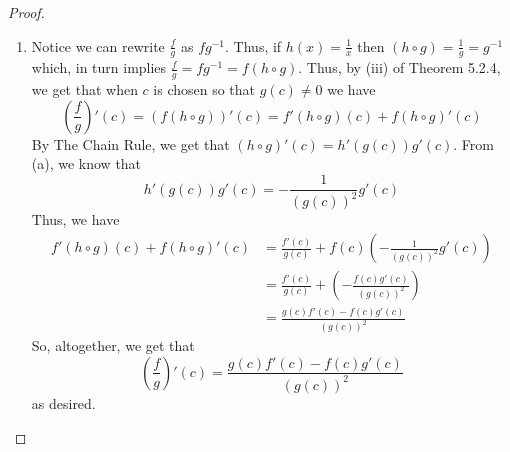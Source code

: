 \begin{enumerate}
\begin{proof}
\begin{enumerate}
        \item Notice we can rewrite \( \frac{f}{g} \) as \( fg^{-1} \). Thus, if \( h(x) = \frac{1}{x} \) then \( (h \circ g) = \frac{1}{g} = g^{-1}\) which, in turn implies \( \frac{f}{g} = fg^{-1} = f(h \circ g) \). Thus, by (iii) of Theorem 5.2.4, we get that when \( c \) is chosen so that \( g(c) \neq 0 \) we have
        \[
        \left(\frac{f}{g}\right)'(c) = (f(h \circ g))'(c) =  f'(h \circ g)(c) + f (h \circ g)'(c)
        \]
        By The Chain Rule, we get that \( (h \circ g)'(c) = h'(g(c))g'(c) \). From (a), we know that
        \[
        h'(g(c))g'(c) = -\frac{1}{(g(c))^{2}}g'(c)
        \]
        Thus, we have
        \begin{align*}
        f'(h \circ g)(c) + f (h \circ g)'(c) &=  \frac{f'(c)}{g(c)}  + f(c)\left( -\frac{1}{(g(c))^{2}}g'(c) \right) \\
        &=  \frac{f'(c)}{g(c)} + \left( -\frac{f(c)g'(c)}{(g(c))^{2}} \right) \\
        &=  \frac{g(c)f'(c) - f(c)g'(c)}{(g(c))^{2}}
        \end{align*}
        So, altogether, we get that
        \[
        \left(\frac{f}{g}\right)'(c) =  \frac{g(c)f'(c) - f(c)g'(c)}{(g(c))^{2}} 
        \]
        as desired.
        

\end{enumerate}
\end{proof}
\end{enumerate}

